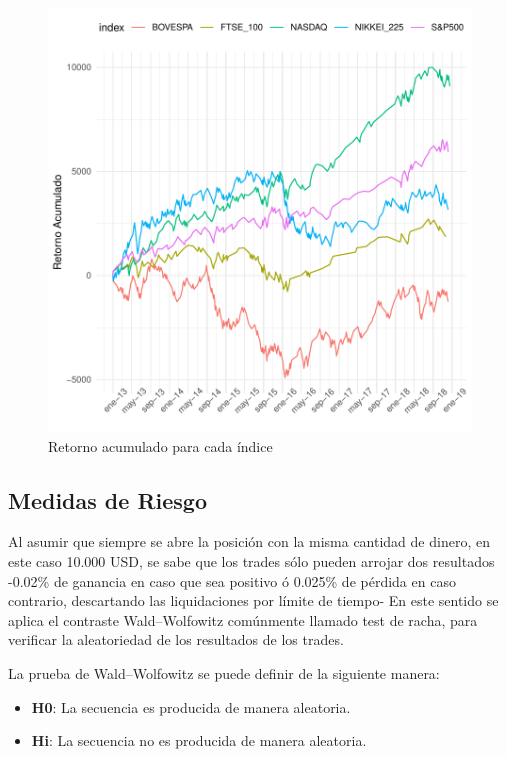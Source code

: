 \documentclass[a4paper,12pt]{Latex/Classes/PhDthesisPSnPDF}
\begin{document}
\begin{figure}[H]
\centering
\includegraphics{main-031}
\caption{Retorno acumulado para cada índice}
\end{figure}

\subsection{Medidas de Riesgo}

Al asumir que siempre se abre la posición con la misma cantidad de dinero, en este caso 10.000 USD, se sabe que los trades sólo pueden arrojar dos resultados -0.02\% de ganancia en caso que sea positivo ó 0.025\% de pérdida en caso contrario, descartando las liquidaciones por límite de tiempo- En este sentido se aplica el contraste Wald–Wolfowitz comúnmente llamado test de racha, para verificar la aleatoriedad de los resultados de los trades.

La prueba de Wald–Wolfowitz se puede definir de la siguiente manera:

\begin{itemize}
\item \textbf{H0}: La secuencia es producida de manera aleatoria.
\item \textbf{Hi}: La secuencia no es producida de manera aleatoria.
\end{itemize}
\end{document}
